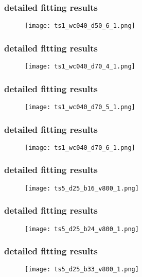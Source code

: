 	\begin{frame}
		\frametitle{\appendixname{} \textendash{} detailed fitting results}
		\begin{figure}
			\texttt{[image: ts1\_wc040\_d50\_6\_1.png]}
		\end{figure}
	\end{frame}

	\begin{frame}
		\frametitle{\appendixname{} \textendash{} detailed fitting results}
		\begin{figure}
			\texttt{[image: ts1\_wc040\_d70\_4\_1.png]}
		\end{figure}
	\end{frame}

	\begin{frame}
		\frametitle{\appendixname{} \textendash{} detailed fitting results}
		\begin{figure}
			\texttt{[image: ts1\_wc040\_d70\_5\_1.png]}
		\end{figure}
	\end{frame}

	\begin{frame}
		\frametitle{\appendixname{} \textendash{} detailed fitting results}
		\begin{figure}
			\texttt{[image: ts1\_wc040\_d70\_6\_1.png]}
		\end{figure}
	\end{frame}

	\begin{frame}
		\frametitle{\appendixname{} \textendash{} detailed fitting results}\label{app:details:ts5}
		\begin{figure}
			\texttt{[image: ts5\_d25\_b16\_v800\_1.png]}
		\end{figure}
	\end{frame}

	\begin{frame}
		\frametitle{\appendixname{} \textendash{} detailed fitting results}
		\begin{figure}
			\texttt{[image: ts5\_d25\_b24\_v800\_1.png]}
		\end{figure}
	\end{frame}

	\begin{frame}
		\frametitle{\appendixname{} \textendash{} detailed fitting results}
		\begin{figure}
			\texttt{[image: ts5\_d25\_b33\_v800\_1.png]}
		\end{figure}
	\end{frame}

